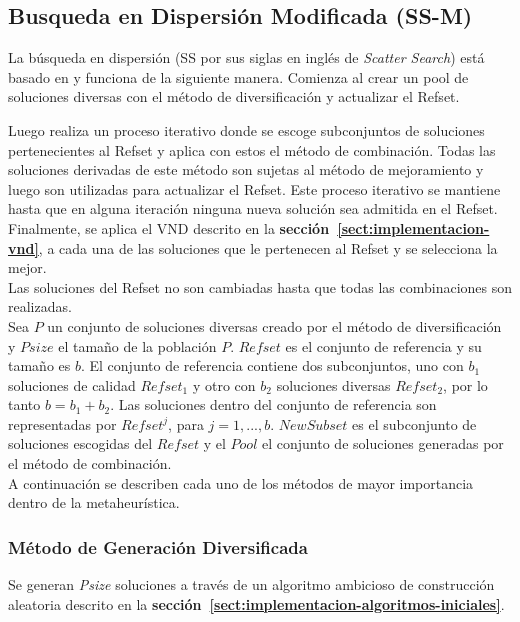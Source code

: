 \subsection{Busqueda en Dispersión Modificada (SS-M)} \label{sect:implementacion-SS}

La búsqueda en dispersión (SS por sus siglas en inglés de \emph{Scatter Search}) está basado en \cite{SCAimp} y funciona de la siguiente manera. Comienza al crear un pool de soluciones diversas con el método de diversificación y actualizar el Refset. 

Luego realiza un proceso iterativo donde se escoge subconjuntos de soluciones pertenecientes al Refset y a\-pli\-ca con estos el método de combinación. Todas las soluciones derivadas de este método son sujetas al método de mejoramiento y luego son utilizadas para actualizar el Refset. Este proceso iterativo se mantiene hasta que en alguna iteración ninguna nueva solución sea admitida en el Refset. Finalmente, se aplica el VND  descrito en la \textbf{sección~\ref{sect:implementacion-vnd}}, a cada una de las soluciones que le pertenecen al Refset y se selecciona la mejor.\\

Las soluciones del Refset no son cambiadas hasta que todas las combinaciones son realizadas.\\ 

Sea $P$ un conjunto de soluciones diversas creado por el método de diversificación   y $Psize$ el tamaño de la población $P$. $Refset$ es el conjunto de referencia y su tamaño es $b$. El conjunto de referencia contiene dos sub\-con\-jun\-tos, uno con $b_{1}$ soluciones de calidad $Refset_{1}$ y otro con $b_{2}$ soluciones diversas $Refset_{2}$, por lo tanto $b = b_{1} + b_{2}$. Las soluciones dentro del conjunto de referencia son representadas por $Refset^{j}$, para $j={1,...,b}$. $NewSubset$ es el subconjunto de soluciones escogidas del $Refset$ y el $Pool$ el conjunto de soluciones generadas por el método de combinación.\\

A continuación se describen cada uno de los métodos de mayor importancia dentro de la metaheurística.

\subsubsection*{Método de Generación Diversificada}

 Se generan \textit{Psize} soluciones a través de un algoritmo ambicioso de construcción aleatoria descrito en la \textbf{sección~\ref{sect:implementacion-algoritmos-iniciales}}.
 
